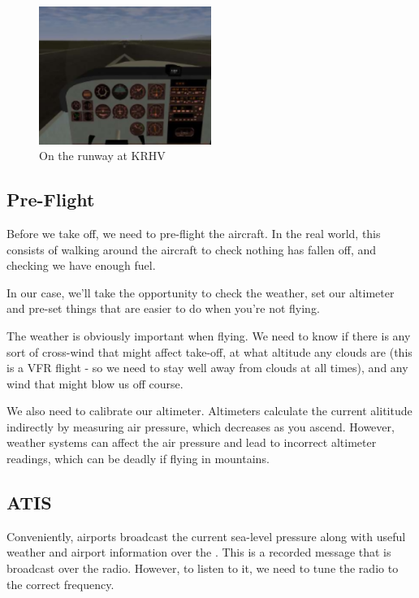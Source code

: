 \begin{figure}[!htp]
\centering
\includegraphics[width=0.5\textwidth]{krhvrunway}
\caption{On the runway at KRHV}
\end{figure}

\subsection{Pre-Flight}

Before we take off, we need to pre-flight the aircraft. In the real world,
this consists of walking around the aircraft to check nothing has fallen
off, and checking we have enough fuel.

In our case, we'll take the opportunity to check the weather, set our
altimeter and pre-set things that are easier to do when you're not flying.

The weather is obviously important when flying. We need to know if
there is any sort of cross-wind that might affect take-off, at what
altitude any clouds are (this is a VFR flight - so we need to stay
well away from clouds at all times), and any wind that might blow us off course.

We also need to calibrate our altimeter. Altimeters calculate the
current alititude indirectly by measuring air pressure, which decreases
as you ascend. However, weather systems can affect the air pressure and
lead to incorrect altimeter readings, which can be deadly if flying in mountains.

\subsection{ATIS}

Conveniently, airports broadcast the current sea-level pressure along
with useful weather and airport information over the .
This is a recorded message that is broadcast over the radio.
However, to listen to it, we need to tune the radio to the correct frequency.

